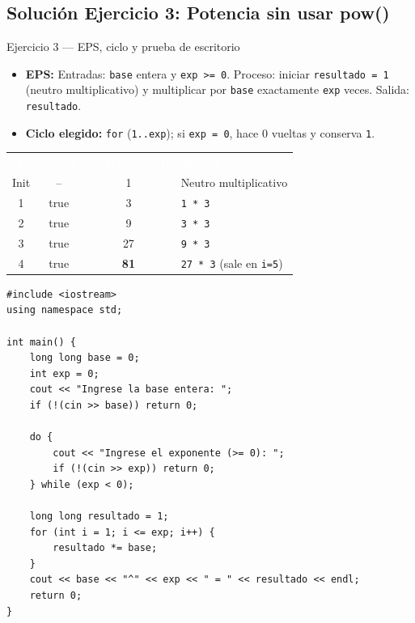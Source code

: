 \documentclass[11pt,letterpaper]{article}
\begin{document}
\subsection{Solución Ejercicio 3: Potencia sin usar pow()}

\begin{solucion}{Ejercicio 3 --- EPS, ciclo y prueba de escritorio}
\begin{itemize}
  \item \textbf{EPS:} Entradas: \texttt{base} entera y \texttt{exp >= 0}. Proceso: iniciar \texttt{resultado = 1} (neutro multiplicativo) y multiplicar por \texttt{base} exactamente \texttt{exp} veces. Salida: \texttt{resultado}.
  \item \textbf{Ciclo elegido:} \texttt{for} (\texttt{1..exp}); si \texttt{exp = 0}, hace 0 vueltas y conserva \texttt{1}.
\end{itemize}
\begin{center}
\footnotesize
\renewcommand{\arraystretch}{1.15}
\begin{tabularx}{0.85\linewidth}{c c c X}
\rowcolor{AzulMarino}
\textcolor{white}{\texttt{i}} & \textcolor{white}{\texttt{i <= 4}} & \textcolor{white}{\texttt{resultado} (\texttt{3\textasciicircum 4})} & \textcolor{white}{\textbf{Acción}} \\
Init & -- & 1 & Neutro multiplicativo \\
1 & true & 3 & \texttt{1 * 3} \\
2 & true & 9 & \texttt{3 * 3} \\
3 & true & 27 & \texttt{9 * 3} \\
4 & true & \textbf{81} & \texttt{27 * 3} (sale en \texttt{i=5}) \\
\bottomrule
\end{tabularx}
\end{center}
\end{solucion}

\begin{lstlisting}[style=cppmonitoria,caption={Solución Ejercicio 3: Potencia mediante multiplicaciones (C++)}]
#include <iostream>
using namespace std;

int main() {
    long long base = 0;
    int exp = 0;
    cout << "Ingrese la base entera: ";
    if (!(cin >> base)) return 0;

    do {
        cout << "Ingrese el exponente (>= 0): ";
        if (!(cin >> exp)) return 0;
    } while (exp < 0);

    long long resultado = 1;
    for (int i = 1; i <= exp; i++) {
        resultado *= base;
    }
    cout << base << "^" << exp << " = " << resultado << endl;
    return 0;
}
\end{lstlisting}
\end{document}
